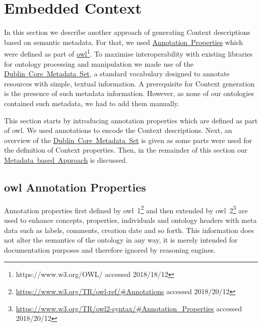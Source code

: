 
\section{Embedded Context}\label{sec:embedded_context}
In this section we describe another approach of generating Context descriptions based on semantic metadata.
For that, we used \hyperref[sec:OWL_annotation_properties]{Annotation~Properties} which were defined as part of \hyperref[sec:OWL_annotation_properties]{\gls{owl}\footnote{\url{https://www.w3.org/OWL/} accessed 2018/18/12}}. To maximise interoperability with existing libraries for ontology processing and manipulation we made use of the \hyperref[sec:dublin_core_metadata_vocabulary]{Dublin~Core~Metadata~Set}, a standard vocabulary designed to annotate resources with simple, textual information. A prerequisite for Context generation is the presence of such metadata information.
However, as none of our ontologies contained such metadata, we had to add them manually. 

This section starts by introducing annotation properties which are defined as part of \gls{owl}. We used annotations to encode the Context descriptions. Next, an overview of the \hyperref[sec:dublin_core_metadata_vocabulary]{Dublin~Core~Metadata~Set} is given as some parts were used for the definition of Context properties. Then, in the remainder of this section our \hyperref[sec:enrichment_metaData_approach]{Metadata~based~Approach} is discussed.

\subsection{\gls{owl} Annotation Properties}\label{sec:OWL_annotation_properties}
Annotation properties first defined by \gls{owl}~1\footnote{\url{https://www.w3.org/TR/owl-ref/\#Annotations} accessed 2018/20/12} and then extended by \gls{owl}~2\footnote{\url{https://www.w3.org/TR/owl2-syntax/\#Annotation_Properties} accessed 2018/20/12} are used to enhance concepts, properties, individuals and ontology headers with meta data such as labels, comments, creation date and so forth. This information does not alter the semantics of the ontology in any way, it is merely intended for documentation purposes and therefore ignored by reasoning engines. 

